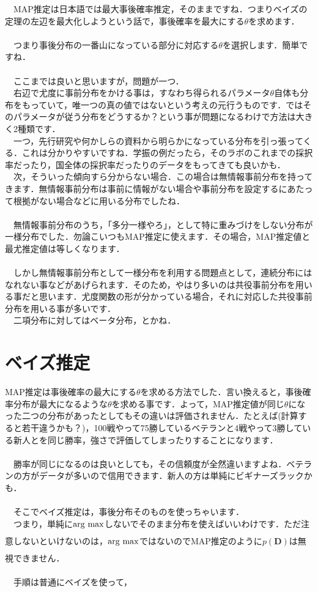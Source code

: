 \documentclass[11pt,a4paper]{ujreport} 	%
\newcommand{\argmax}{\mathop{\rm arg~max}\limits}
\begin{document}
　MAP推定は日本語では最大事後確率推定，そのままですね．つまりベイズの定理の左辺を最大化しようという話で，事後確率を最大にする$\theta$を求めます．\\
\\
　つまり事後分布の一番山になっている部分に対応する$\theta$を選択します．簡単ですね．\\
\\
　ここまでは良いと思いますが，問題が一つ．\\
　右辺で尤度に事前分布をかける事は，すなわち得られるパラメータ$\theta$自体も分布をもっていて，唯一つの真の値ではないという考えの元行うものです．ではそのパラメータが従う分布をどうするか？という事が問題になるわけで方法は大きく2種類です．\\
　一つ，先行研究や何かしらの資料から明らかになっている分布を引っ張ってくる．これは分かりやすいですね．学振の例だったら，そのラボのこれまでの採択率だったり，国全体の採択率だったりのデータをもってきても良いかも．\\
　次，そういった傾向すら分からない場合．この場合は無情報事前分布を持ってきます．無情報事前分布は事前に情報がない場合や事前分布を設定するにあたって根拠がない場合などに用いる分布でしたね．\\
\\
　無情報事前分布のうち，「多分一様やろ」，として特に重みづけをしない分布が一様分布でした．勿論こいつもMAP推定に使えます．その場合，MAP推定値と最尤推定値は等しくなります．\\
\\
　しかし無情報事前分布として一様分布を利用する問題点として，連続分布にはなれない事などがあげられます．そのため，やはり多いのは共役事前分布を用いる事だと思います．尤度関数の形が分かっている場合，それに対応した共役事前分布を用いる事が多いです．\\
　二項分布に対してはベータ分布，とかね．

\section{ベイズ推定}
MAP推定は事後確率の最大にする$\theta$を求める方法でした．言い換えると，事後確率分布が最大になるような$\theta$を求める事です．よって，MAP推定値が同じ$\theta$になった二つの分布があったとしてもその違いは評価されません．たとえば(計算すると若干違うかも？)，100戦やって75勝しているベテランと4戦やって3勝している新人とを同じ勝率，強さで評価してしまったりすることになります．\\
\\
　勝率が同じになるのは良いとしても，その信頼度が全然違いますよね．ベテランの方がデータが多いので信用できます．新人の方は単純にビギナーズラックかも．\\
\\
　そこでベイズ推定は，事後分布そのものを使っちゃいます．\\
　つまり，単純に$\argmax_{}$しないでそのまま分布を使えばいいわけです．ただ注意しないといけないのは，$\argmax_{}$ではないのでMAP推定のように$p(\mathbf{D})$は無視できません．\\
\\
　手順は普通にベイズを使って，
\end{document}
